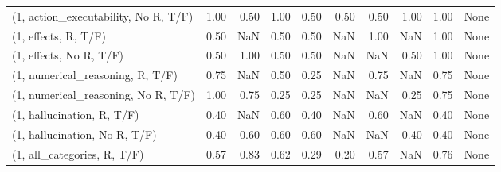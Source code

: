 \begin{table*}[h!]
\begin{adjustbox}{width=2\columnwidth,center}
\begin{tabular}{lrrr|rrr|rrr}
(1, action\_executability, No R, T/F) &                      1.00 &                  0.50 &                      1.00 &                          0.50 &                      0.50 &                          0.50 &                                   1.00 &                               1.00 &                                  None \\
(1, effects, R, T/F)                 &                      0.50 &                   NaN &                      0.50 &                          0.50 &                       NaN &                          1.00 &                                    NaN &                               1.00 &                                  None \\
(1, effects, No R, T/F)              &                      0.50 &                  1.00 &                      0.50 &                          0.50 &                       NaN &                           NaN &                                   0.50 &                               1.00 &                                  None \\
(1, numerical\_reasoning, R, T/F)     &                      0.75 &                   NaN &                      0.50 &                          0.25 &                       NaN &                          0.75 &                                    NaN &                               0.75 &                                  None \\
(1, numerical\_reasoning, No R, T/F)  &                      1.00 &                  0.75 &                      0.25 &                          0.25 &                       NaN &                           NaN &                                   0.25 &                               0.75 &                                  None \\
(1, hallucination, R, T/F)           &                      0.40 &                   NaN &                      0.60 &                          0.40 &                       NaN &                          0.60 &                                    NaN &                               0.40 &                                  None \\
(1, hallucination, No R, T/F)        &                      0.40 &                  0.60 &                      0.60 &                          0.60 &                       NaN &                           NaN &                                   0.40 &                               0.40 &                                  None \\
(1, all\_categories, R, T/F)          &                      0.57 &                  0.83 &                      0.62 &                          0.29 &                      0.20 &                          0.57 &                                    NaN &                               0.76 &                                  None \\

\end{tabular}
\end{adjustbox}
\end{table*}
